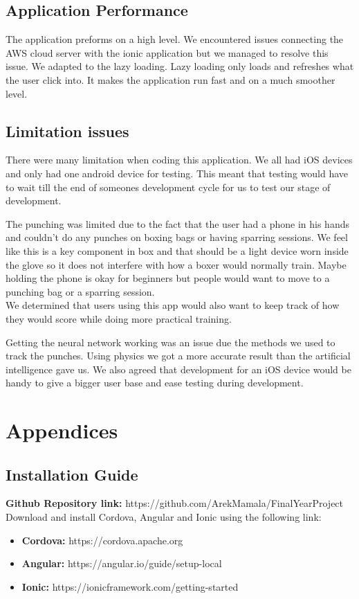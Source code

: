 \documentclass[a4paper,12pt]{report}
\begin{document}
\section{Application Performance}
The application preforms on a high level. We encountered issues connecting the AWS cloud server with the ionic application but we managed to resolve this issue. We adapted to the lazy loading. Lazy loading only loads and refreshes what the user click into. It makes the application run fast and on a much smoother level.

\section{Limitation issues}
There were many limitation when coding this application. We all had iOS devices and only had one android device for testing. This meant that testing would have to wait till the end of someones development cycle for us to test our stage of development.

The punching was limited due to the fact that the user had a phone in his hands and couldn't do any punches on boxing bags or having sparring sessions. We feel like this is a key component in box and that should be a light device worn inside the glove so it does not interfere with how a boxer would normally train. Maybe holding the phone is okay for beginners but people would want to move to a punching bag or a sparring session.\\ We determined that users using this app would also want to keep track of how they would score while doing more practical training. 

Getting the neural network working was an issue due the methods we used to track the punches. Using physics we got a more accurate result than the artificial intelligence gave us. We also agreed that development for an iOS device would be handy to give a bigger user base and ease testing during development.
\chapter{Appendices}

\section{Installation Guide}
\textbf{Github Repository link:} https://github.com/ArekMamala/FinalYearProject \\

Download and install Cordova, Angular and Ionic using the following
link:       
\begin{itemize}
    \item \textbf{Cordova: } https://cordova.apache.org
    \item \textbf{Angular: } https://angular.io/guide/setup-local
    \item \textbf{Ionic: } https://ionicframework.com/getting-started\\
\end{itemize}
\end{document}

